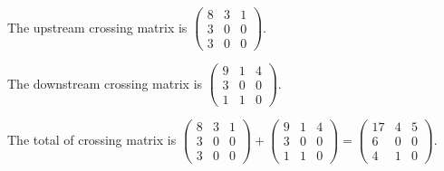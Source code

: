 \begin{Exercise}
\begin{solution}
The upstream crossing matrix is
$
\begin{pmatrix}
8 & 3 & 1 \\
3 & 0 & 0 \\
3 & 0 & 0
\end{pmatrix}.
$

The downstream crossing matrix is
$
\begin{pmatrix}
9 & 1 & 4 \\
3 & 0 & 0 \\
1 & 1 & 0
\end{pmatrix}.
$

The total of crossing matrix is
$
\begin{pmatrix}
8 & 3 & 1 \\
3 & 0 & 0 \\
3 & 0 & 0
\end{pmatrix}
+ \begin{pmatrix}
9 & 1 & 4 \\
3 & 0 & 0 \\
1 & 1 & 0
\end{pmatrix}
= \begin{pmatrix}
17 & 4 & 5 \\
6 & 0 & 0 \\
4 & 1 & 0
\end{pmatrix}.
$
\end{solution}
\end{Exercise}